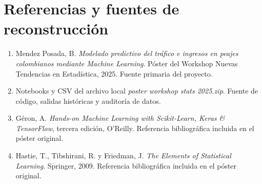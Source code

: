 \documentclass[11pt,a4paper]{article}
\begin{document}
\section{Referencias y fuentes de reconstrucción}
\begin{enumerate}
\item Mendez Posada, B. \emph{Modelado predictivo del tráfico e ingresos en peajes colombianos mediante Machine Learning}. Póster del Workshop Nuevas Tendencias en Estadística, 2025. Fuente primaria del proyecto.
\item Notebooks y CSV del archivo local \emph{poster workshop stats 2025.zip}. Fuente de código, salidas históricas y auditoría de datos.
\item Géron, A. \emph{Hands-on Machine Learning with Scikit-Learn, Keras \& TensorFlow}, tercera edición, O'Reilly. Referencia bibliográfica incluida en el póster original.
\item Hastie, T., Tibshirani, R. y Friedman, J. \emph{The Elements of Statistical Learning}. Springer, 2009. Referencia bibliográfica incluida en el póster original.
\end{enumerate}
\end{document}
